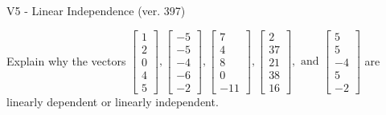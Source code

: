 \begin{exercise}
  \begin{exerciseTitle}V5 - Linear Independence (ver. 397)\end{exerciseTitle}
  \begin{exerciseStatement}
    Explain why the vectors \(\left[\begin{array}{r}
1 \\
2 \\
0 \\
4 \\
5
\end{array}\right] , \left[\begin{array}{r}
-5 \\
-5 \\
-4 \\
-6 \\
-2
\end{array}\right] , \left[\begin{array}{r}
7 \\
4 \\
8 \\
0 \\
-11
\end{array}\right] , \left[\begin{array}{r}
2 \\
37 \\
21 \\
38 \\
16
\end{array}\right] , \text{ and } \left[\begin{array}{r}
5 \\
5 \\
-4 \\
5 \\
-2
\end{array}\right]\) are linearly dependent or linearly independent.	



\end{exerciseStatement}
\end{exercise}
